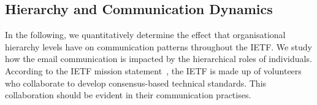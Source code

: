 \documentclass[twocolumn,10pt]{article}
\begin{document}
\subsection{Hierarchy and Communication Dynamics}
\label{sec:org-dynamics:hierarchy}


In the following, we quantitatively determine the effect that organisational
hierarchy levels have on communication patterns throughout the IETF. 
We study how the email communication is impacted by the hierarchical roles
of individuals. According to the IETF mission statement~\cite{rfc3935}, the
IETF is made up of volunteers who collaborate to develop consensus-based
technical standards. This collaboration should be evident in their
communication practises.

\end{document}
